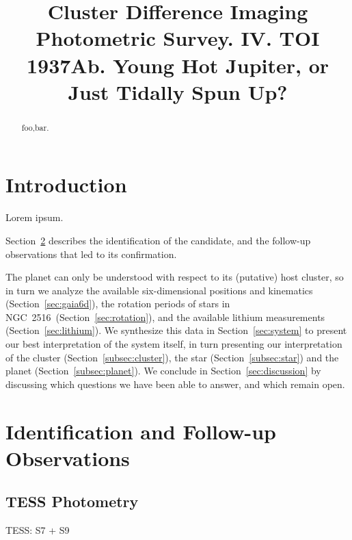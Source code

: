 \documentclass[12pt,twocolumn,tighten]{aastex63}
\newcommand{\cn}{NGC~2516} %
\begin{document}

\title{
  Cluster Difference Imaging Photometric Survey. IV.
  TOI 1937Ab. Young Hot Jupiter, or Just Tidally Spun Up?
}



\begin{abstract}
  foo,bar.
\end{abstract}




\section{Introduction}

Lorem ipsum.

Section~\ref{sec:observations} describes the identification of the
candidate, and the follow-up observations that led to its confirmation.

The planet can only be understood with respect to its (putative)
host cluster, so in turn we analyze the
available six-dimensional positions and kinematics (Section~\ref{sec:gaia6d}),
the rotation periods of stars in \cn\ 
(Section~\ref{sec:rotation}), and the available lithium measurements
(Section~\ref{sec:lithium}).
We synthesize this data in
Section~\ref{sec:system} to present our best interpretation of the
system itself, in turn presenting our interpretation of the
cluster
(Section~\ref{subsec:cluster}), the star (Section~\ref{subsec:star})
and the planet (Section~\ref{subsec:planet}).  We conclude in
Section~\ref{sec:discussion} by discussing which questions we have
been able to answer, and which remain open.



\section{Identification and Follow-up Observations}
\label{sec:observations}


  \subsection{TESS Photometry}
  \label{subsec:tess}
  TESS: S7 + S9
\end{document}
